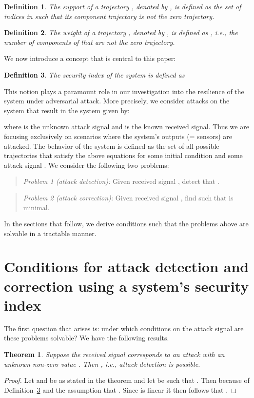 \documentclass[letterpaper, 10 pt, conference]{ieeeconf}
\newtheorem{definition}{Definition}[section]
\newtheorem{thm}{Theorem}[section]
\begin{document}
\begin{definition} \label{def:supp_y_trajectory} The {\em support} of a trajectory , denoted by , is defined as the set of indices  in  such that its component trajectory  is not the zero trajectory. 
\end{definition}
\begin{definition} The {\em weight} of a trajectory , denoted by , is defined as , i.e., the number of components of  that are not the zero trajectory.
\end{definition}

We now introduce a concept that is central to this paper:
\begin{definition}\label{def_security} The {\em security index} of the system  is defined as 

\end{definition}
This notion plays a paramount role in our investigation into the resilience of the system under adversarial attack. More precisely, we consider attacks on the system  that result in the system  given by:

where  is the unknown attack signal and  is the known received signal. Thus we are focusing exclusively on scenarios where the system's outputs (= sensors) are attacked. The behavior  of the system  is defined as the set of all possible trajectories  that satisfy the above equations for some initial condition  and some attack signal . We consider the following two problems:

\begin{quote}
{\em Problem 1 (attack detection):} Given received signal , detect that . 
\end{quote}
\begin{quote}
{\em Problem 2 (attack correction):} Given received signal , find  such that  is minimal. 
\end{quote}
In the sections that follow, we derive conditions such that the problems above are solvable in a tractable manner.

\section{Conditions for attack detection and correction using a system's security index}
The first question that arises is: under which conditions on the attack signal  are these problems solvable? We have the following results. 

\begin{thm}\label{thm_detect}
Suppose the received signal  corresponds to an attack  with  an unknown non-zero value . Then , i.e., attack detection is possible. 
\end{thm}
\begin{proof}
Let  and  be as stated in the theorem and let  be such that . Then  because of Definition~\ref{def_security} and the assumption that . Since  is linear it then follows that .	
\end{proof}
\end{document}
